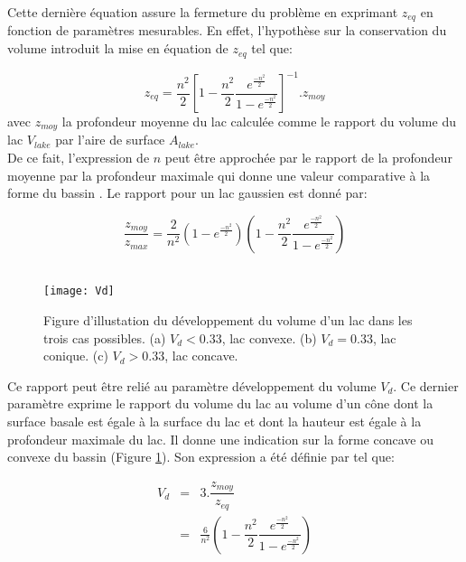 \noindent Cette dernière équation assure la fermeture du problème en exprimant $z_{eq}$ en fonction de paramètres mesurables. En effet, l'hypothèse sur la conservation du volume introduit la mise en équation de $z_{eq}$ tel que:

\begin{equation}
z_{eq}=\dfrac{n^2}{2}\left[1 - \dfrac{n^2}{2}\dfrac{e^{\frac{-n^2}{2}}}{1-e^{\frac{-n^2}{2}}}\right]^{-1}.z_{moy}
\end{equation}
avec $z_{moy}$ la profondeur moyenne du lac calculée comme le rapport du volume du lac $V_{lake}$ par l'aire de surface $A_{lake}$.\\

\noindent De ce fait, l'expression de $n$ peut être approchée par le rapport de la profondeur moyenne par la profondeur maximale qui donne une valeur comparative à la forme du bassin \citep{wetzel2001}. Le rapport pour un lac gaussien est donné par:

\begin{equation}
\dfrac{z_{moy}}{z_{max}} = \frac{2}{n^2}(1-e^{\frac{-n^2}{2}})\left(1 - \dfrac{n^2}{2}\dfrac{e^{\frac{-n^2}{2}}}{1-e^{\frac{-n^2}{2}}}\right)
\end{equation}
~\

\begin{figure}
\texttt{[image: Vd]}
\caption{Figure d'illustation du développement du volume d'un lac dans les trois cas possibles. (a) $V_{d} < 0.33$, lac convexe. (b) $V_{d} = 0.33$, lac conique. (c) $V_{d} > 0.33$, lac concave.}
\label{Vd}
\end{figure}

\noindent Ce rapport peut être relié au paramètre développement du volume $V_{d}$. Ce dernier paramètre exprime le rapport du volume du lac au volume d'un cône dont la surface basale est égale à la surface du lac et dont la hauteur est égale à la profondeur maximale du lac. Il donne une indication sur la forme concave ou convexe du bassin (Figure \ref{Vd}).  Son expression a été définie par \citet{hutchinson1957} tel que: 

\begin{eqnarray}
V_{d}&=& 3.\dfrac{z_{moy}}{z_{eq}} \\
     &=& \frac{6}{n^2} \left(1 - \dfrac{n^2}{2}\dfrac{e^{\frac{-n^2}{2}}}{1-e^{\frac{-n^2}{2}}}\right)
\end{eqnarray}

